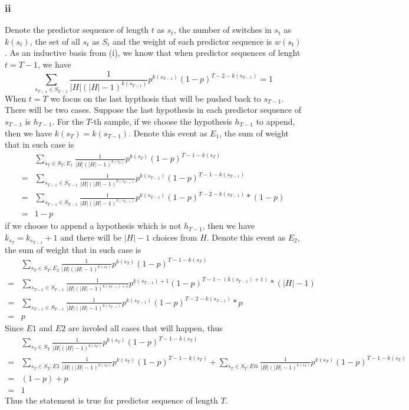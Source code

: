 \documentclass{article}
\begin{document}
	\subsubsection{ii}
	Denote the predictor sequence of length $t$ as $s_t$, the number of switches in $s_t$ as $k(s_t)$, the set of all $s_t$ as $S_t$ and the weight of each predictor sequence is $w(s_t)$.
	As an inductive basis from (i), we know that when predictor sequences of lenght $t=T-1$, we have
	\begin{equation}
	\sum_{s_{T-1} \in S_{T-1}}\frac{1}{|H|(|H|-1)^{k(s_{T-1})}}p^{k(s_{T-1})}(1-p)^{T-2-k(s_{T-1})}=1
	\label{eq37}
	\end{equation}
	When $t=T$ we focus on the last hypthosis that will be pushed back to $s_{T-1}$. There will be two cases.
	Suppose the last hypothesis in each predictor sequence of $s_{T-1}$ is $h_{T-1}$.
	For the $T$-th sample, if we choose the hypothesis $h_{T-1}$ to append, then we have $k(s_T)=k(s_{T-1})$. Denote this event as $E_1$, the sum of weight that in such case is
	\begin{equation}
	\begin{aligned}
	&\sum_{s_T \in S_T:E_1}\frac{1}{|H|(|H|-1)^{k(s_T)}}p^{k(s_T)}(1-p)^{T-1-k(s_T)}\\
	=&\sum_{s_{T-1} \in S_{T-1}}\frac{1}{|H|(|H|-1)^{k(s_{T-1})}}p^{k(s_{T-1})}(1-p)^{T-1-k(s_{T-1})}\\
	=&\sum_{s_{T-1} \in S_{T-1}}\frac{1}{|H|(|H|-1)^{k(s_{T-1})}}p^{k(s_{T-1})}(1-p)^{T-2-k(s_{T-1})}*(1-p)\\
	=& 1-p
	\end{aligned}
	\label{eq38}
	\end{equation}
	if we choose to append a hypothesis which is not $h_{T-1}$, then we have $k_{s_T}=k_{s_{T-1}}+1$ and there will be $|H|-1$ choices from $H$. Denote this event as $E_2$, the sum of weight that in such case is
	\begin{equation}
	\begin{aligned}
	&\sum_{s_T \in S_T:E_2}\frac{1}{|H|(|H|-1)^{k(s_T)}}p^{k(s_T)}(1-p)^{T-1-k(s_T)}\\
	=&\sum_{s_{T-1} \in S_{T-1}}\frac{1}{|H|(|H|-1)^{k(s_{T-1})+1}}p^{k(s_{T-1})+1}(1-p)^{T-1-(k(s_{T-1})+1)}*(|H|-1)\\
	=&\sum_{s_{T-1} \in S_{T-1}}\frac{1}{|H|(|H|-1)^{k(s_{T-1})}}p^{k(s_{T-1})}(1-p)^{T-2-k(s_{T-1})}*p\\
	=& p
	\end{aligned}
	\label{eq39}
	\end{equation}
	Since $E1$ and $E2$ are involed all cases that will happen, thus
	\begin{equation}
	\begin{aligned}
	&\sum_{s_T \in S_T}\frac{1}{|H|(|H|-1)^{k(s_T)}}p^{k(s_T)}(1-p)^{T-1-k(s_T)}\\
	=&\sum_{s_T \in S_T:E1}\frac{1}{|H|(|H|-1)^{k(s_T)}}p^{k(s_T)}(1-p)^{T-1-k(s_T)} +\sum_{s_T \in S_T:E@}\frac{1}{|H|(|H|-1)^{k(s_T)}}p^{k(s_T)}(1-p)^{T-1-k(s_T)}\\
	=& (1-p)+ p\\
	=& 1
	\end{aligned}
	\label{eq40}
	\end{equation}
	Thus the statement is true for predictor sequence of length $T$.
\end{document}

